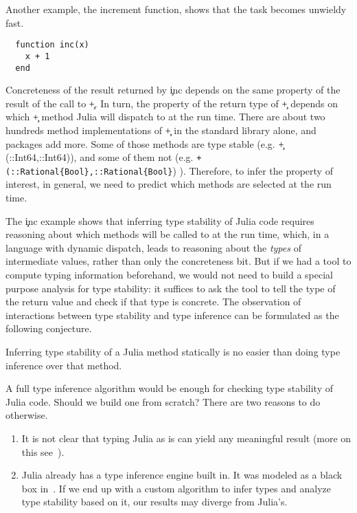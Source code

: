 \documentclass[sigplan,review,anonymous]{acmart}
\begin{document}
Another example, the increment function, shows that the task becomes unwieldy fast.
%
\begin{verbatim}
  function inc(x)
    x + 1
  end
\end{verbatim}
%
Concreteness of the result returned by \c{inc} depends on the same property of
the result of the call to \c{+}. In turn, the property of the return type of
\c{+} depends on which \c{+} method Julia will dispatch to at the run time.
There are about two hundreds method implementations of \c{+} in the standard
library alone, and packages add more. Some of those methods are type stable
(e.g. \c{+(::Int64,::Int64)}), and some of them not (e.g.
\lstinline|+(::Rational{Bool},::Rational{Bool}|)
).
Therefore,
to infer the property of interest, in general,
we need to predict which methods are selected at the run time.

The \c{inc} example shows that inferring type stability of Julia code
requires
reasoning about which methods will be called to at the run time, which, in a
language with dynamic dispatch, leads
to reasoning about the \emph{types} of intermediate values, rather than only
the concreteness bit. But if we had a tool to compute typing information
beforehand, we would not need to build a special purpose analysis for type
stability: it suffices to ask the tool to tell the type of the return value and
check if that type is concrete. The observation of interactions between type
stability and type inference can be formulated as the following conjecture.

\begin{conjecture}
Inferring type stability of a Julia method statically is no easier than doing type
inference over that method.
\end{conjecture}

A full type inference algorithm would be enough for checking type stability of
Julia code. Should we build one from scratch? There are two reasons to do
otherwise.
\begin{enumerate}

  \item It is not clear that typing Julia as is can yield any meaningful result
  (more on this see~\cite{Chung23}).

  \item Julia already has a type inference engine built in. It was modeled
        as a black box in~\cite{Pelenitsyn21}. If we end up with a
        custom algorithm to infer types and analyze type stability based on it,
        our results may diverge from Julia's.
\end{enumerate}
\end{document}
